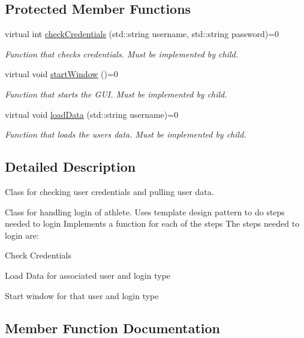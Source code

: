 \subsection*{Protected Member Functions}
\begin{DoxyCompactItemize}
\item 
virtual int \mbox{\hyperlink{classLogin_afaf4316c2ce2eef1e645d8472d7e9ccd}{check\+Credentials}} (std\+::string username, std\+::string password)=0
\begin{DoxyCompactList}\small\item\em Function that checks credentials. Must be implemented by child. \end{DoxyCompactList}\item 
virtual void \mbox{\hyperlink{classLogin_a91bc4d81c3d966d97320a988af1c4363}{start\+Window}} ()=0
\begin{DoxyCompactList}\small\item\em Function that starts the G\+UI. Must be implemented by child. \end{DoxyCompactList}\item 
virtual void \mbox{\hyperlink{classLogin_aaa5bbdeef3c24022901a294af5f2be39}{load\+Data}} (std\+::string username)=0
\begin{DoxyCompactList}\small\item\em Function that loads the users data. Must be implemented by child. \end{DoxyCompactList}\end{DoxyCompactItemize}


\subsection{Detailed Description}
Class for checking user credentials and pulling user data. 

Class for handling login of athlete. Uses template design pattern to do steps needed to login Implements a function for each of the steps The steps needed to login are\+:
\begin{DoxyEnumerate}
\item Check Credentials
\item Load Data for associated user and login type
\item Start window for that user and login type 
\end{DoxyEnumerate}

\subsection{Member Function Documentation}
\mbox{\label{classLogin_afaf4316c2ce2eef1e645d8472d7e9ccd}} 
